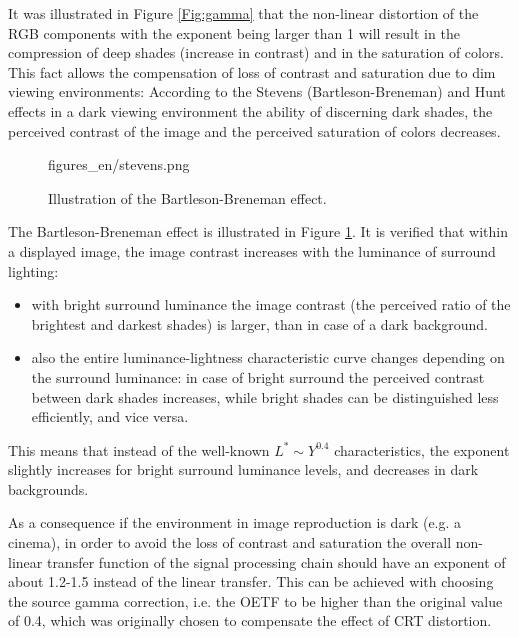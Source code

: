 It was illustrated in Figure \ref{Fig:gamma} that the non-linear distortion of the RGB components with the exponent being larger than 1 will result in the compression of deep shades (increase in contrast) and in the saturation of colors.
This fact allows the compensation of loss of contrast and saturation due to dim viewing environments:
According to the Stevens (Bartleson-Breneman) and Hunt effects in a dark viewing environment the ability of discerning dark shades, the perceived contrast of the image and the perceived saturation of colors decreases.
%
\begin{figure}[]
	\centering
	\begin{overpic}[width = 1\columnwidth ]{figures_en/stevens.png}
	\end{overpic}
	\caption{Illustration of the Bartleson-Breneman effect.}
	\label{Fig:stevens_effect}
\end{figure}

The Bartleson-Breneman effect is illustrated in Figure \ref{Fig:stevens_effect}.
It is verified that within a displayed image, the image contrast  increases with the luminance of surround lighting:
\begin{itemize}
\item with bright surround luminance the image contrast (the perceived ratio of the brightest and darkest shades) is larger, than in case of a dark background.
\item also the entire luminance-lightness characteristic curve changes depending on the surround luminance: in case of bright surround the perceived contrast between dark shades increases, while bright shades can be distinguished less efficiently, and vice versa.
\end{itemize}
This means that instead of the well-known $L^* \sim Y^{0.4}$ characteristics, the exponent slightly increases for bright surround luminance levels, and decreases in dark backgrounds.

As a consequence if the environment in image reproduction is dark (e.g. a cinema), in order to avoid the loss of contrast and saturation the overall non-linear transfer function of the signal processing chain should have an exponent of about 1.2-1.5 instead of the linear transfer.
This can be achieved with choosing the source gamma correction, i.e. the OETF to be higher than the original value of 0.4, which was originally chosen to compensate the effect of CRT distortion.

